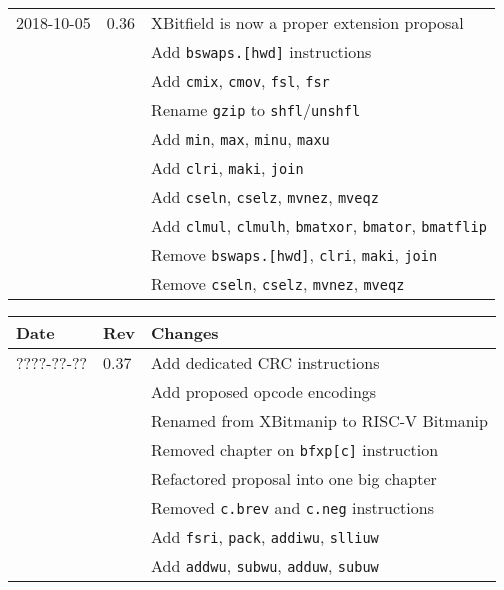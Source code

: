\documentclass[twoside,11pt]{book}
\begin{document}
\begin{center}
\begin{tabular}{lll}
2018-10-05 & 0.36 & XBitfield is now a proper extension proposal \\
           &      & Add {\tt bswaps.[hwd]} instructions \\
           &      & Add {\tt cmix}, {\tt cmov}, {\tt fsl}, {\tt fsr} \\
           &      & Rename {\tt gzip} to {\tt shfl}/{\tt unshfl} \\
           &      & Add {\tt min}, {\tt max}, {\tt minu}, {\tt maxu} \\
           &      & Add {\tt clri}, {\tt maki}, {\tt join} \\
           &      & Add {\tt cseln}, {\tt cselz}, {\tt mvnez}, {\tt mveqz} \\
           &      & Add {\tt clmul}, {\tt clmulh}, {\tt bmatxor}, {\tt bmator}, {\tt bmatflip} \\
           &      & Remove {\tt bswaps.[hwd]}, {\tt clri}, {\tt maki}, {\tt join} \\
           &      & Remove {\tt cseln}, {\tt cselz}, {\tt mvnez}, {\tt mveqz}
\end{tabular}
\end{center}

\begin{center}
\begin{tabular}{lll}
Date & Rev & Changes \\
\hline
????-??-?? & 0.37 & Add dedicated CRC instructions \\
           &      & Add proposed opcode encodings \\
           &      & Renamed from XBitmanip to RISC-V Bitmanip \\
           &      & Removed chapter on {\tt bfxp[c]} instruction \\
           &      & Refactored proposal into one big chapter \\
           &      & Removed {\tt c.brev} and {\tt c.neg} instructions \\
           &      & Add {\tt fsri}, {\tt pack}, {\tt addiwu}, {\tt slliuw} \\
           &      & Add {\tt addwu}, {\tt subwu}, {\tt adduw}, {\tt subuw}
\end{tabular}
\end{center}



\end{document}
